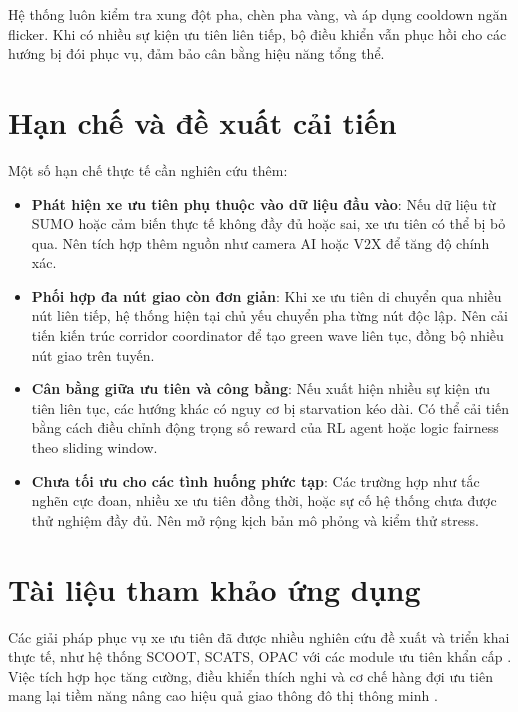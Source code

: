 Hệ thống luôn kiểm tra xung đột pha, chèn pha vàng, và áp dụng cooldown ngăn flicker. Khi có nhiều sự kiện ưu tiên liên tiếp, bộ điều khiển vẫn phục hồi cho các hướng bị đói phục vụ, đảm bảo cân bằng hiệu năng tổng thể.

\section{Hạn chế và đề xuất cải tiến}

Một số hạn chế thực tế cần nghiên cứu thêm:
\begin{itemize}
    \item \textbf{Phát hiện xe ưu tiên phụ thuộc vào dữ liệu đầu vào}: Nếu dữ liệu từ SUMO hoặc cảm biến thực tế không đầy đủ hoặc sai, xe ưu tiên có thể bị bỏ qua. Nên tích hợp thêm nguồn như camera AI hoặc V2X để tăng độ chính xác.
    \item \textbf{Phối hợp đa nút giao còn đơn giản}: Khi xe ưu tiên di chuyển qua nhiều nút liên tiếp, hệ thống hiện tại chủ yếu chuyển pha từng nút độc lập. Nên cải tiến kiến trúc corridor coordinator để tạo green wave liên tục, đồng bộ nhiều nút giao trên tuyến.
    \item \textbf{Cân bằng giữa ưu tiên và công bằng}: Nếu xuất hiện nhiều sự kiện ưu tiên liên tục, các hướng khác có nguy cơ bị starvation kéo dài. Có thể cải tiến bằng cách điều chỉnh động trọng số reward của RL agent hoặc logic fairness theo sliding window.
    \item \textbf{Chưa tối ưu cho các tình huống phức tạp}: Các trường hợp như tắc nghẽn cực đoan, nhiều xe ưu tiên đồng thời, hoặc sự cố hệ thống chưa được thử nghiệm đầy đủ. Nên mở rộng kịch bản mô phỏng và kiểm thử stress.
\end{itemize}
\section{Tài liệu tham khảo ứng dụng}

Các giải pháp phục vụ xe ưu tiên đã được nhiều nghiên cứu đề xuất và triển khai thực tế, như hệ thống SCOOT, SCATS, OPAC với các module ưu tiên khẩn cấp \cite{Hunt1981, Lowrie1990, Mirchandani2001}. Việc tích hợp học tăng cường, điều khiển thích nghi và cơ chế hàng đợi ưu tiên mang lại tiềm năng nâng cao hiệu quả giao thông đô thị thông minh \cite{Eom2020, Wei2019, Shaikh2022}.
